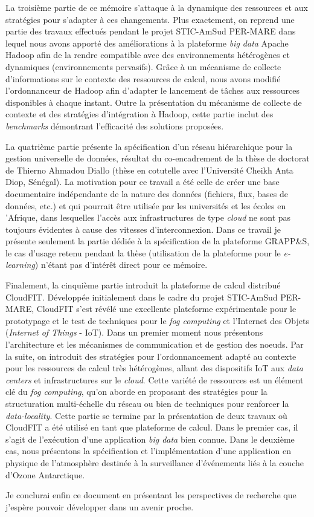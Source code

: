 La troisième partie de ce mémoire s'attaque à la dynamique des ressources et aux stratégies pour s'adapter à ces changements. Plus exactement, on reprend une partie des travaux effectués pendant le projet STIC-AmSud PER-MARE dans lequel nous avons apporté des améliorations à la plateforme \textit{big data} Apache Hadoop afin de la rendre compatible avec des environnements hétérogènes et dynamiques (environnements pervasifs). Grâce à un mécanisme de collecte d'informations sur le contexte des ressources de calcul, nous avons modifié l'ordonnanceur de Hadoop afin d'adapter le lancement de tâches aux ressources disponibles à chaque instant. Outre la présentation du mécanisme de collecte de contexte et des stratégies d'intégration à Hadoop, cette partie inclut des \textit{benchmarks} démontrant l'efficacité des solutions proposées. 

La quatrième partie présente la spécification d'un réseau hiérarchique pour la gestion universelle de données, résultat du co-encadrement de la thèse de doctorat de Thierno Ahmadou Diallo (thèse en cotutelle avec l'Université Cheikh Anta Diop, Sénégal). La motivation pour ce travail a été celle de créer une base documentaire indépendante de la nature des données (fichiers, flux, bases de données, etc.) et qui pourrait être utilisée par les universités et les écoles en 'Afrique, dans lesquelles l'accès aux infrastructures de type \textit{cloud} ne sont pas toujours évidentes à cause des vitesses d'interconnexion. Dans ce travail je présente seulement la partie dédiée à la spécification de la plateforme GRAPP\&S, le cas d'usage retenu pendant la thèse (utilisation de la plateforme pour le \textit{e-learning}) n'étant pas d'intérêt direct pour ce mémoire. 

Finalement, la cinquième partie introduit la plateforme de calcul distribué CloudFIT. Développée initialement dans le cadre du projet STIC-AmSud PER-MARE, CloudFIT s'est révélé une excellente plateforme expérimentale pour le prototypage et le test de techniques pour le \textit{fog computing} et l'Internet des Objets (\textit{Internet of Things} - IoT). Dans un premier moment nous présentons l'architecture et les mécanismes de communication et de gestion des n{oe}uds. Par la suite, on introduit des stratégies pour l'ordonnancement adapté au contexte pour les ressources de calcul très hétérogènes, allant des dispositifs IoT aux \textit{data centers} et infrastructures sur le \textit{cloud}. Cette variété de ressources est un élément clé du \textit{fog computing}, qu'on aborde en proposant des stratégies pour la structuration multi-échelle du réseau ou bien de techniques pour renforcer la \textit{data-locality}. Cette partie se termine par la présentation de deux travaux où CloudFIT a été utilisé en tant que plateforme de calcul. Dans le premier cas, il s'agit de l'exécution d'une application \textit{big data} bien connue. Dans le deuxième cas, nous présentons la spécification et l'implémentation d'une application en physique de l'atmosphère destinée à la surveillance d'événements liés à la couche d'Ozone Antarctique. 

Je conclurai enfin ce document en présentant les perspectives de recherche que j'espère pouvoir développer dans un avenir proche.


 

